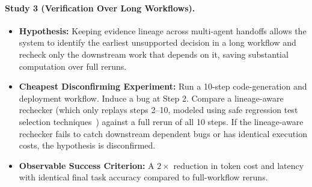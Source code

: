 \documentclass[manuscript,screen,nonacm]{acmart}
\begin{document}
\paragraph{Study 3 (Verification Over Long Workflows).}
\begin{itemize}
    \item \textbf{Hypothesis:} Keeping evidence lineage across multi-agent handoffs allows the system to identify the earliest unsupported decision in a long workflow and recheck only the downstream work that depends on it, saving substantial computation over full reruns.
    \item \textbf{Cheapest Disconfirming Experiment:} Run a 10-step code-generation and deployment workflow. Induce a bug at Step 2. Compare a lineage-aware rechecker (which only replays steps 2--10, modeled using safe regression test selection techniques~\cite{rothermel1997safe,gligoric2015practical}) against a full rerun of all 10 steps. If the lineage-aware rechecker fails to catch downstream dependent bugs or has identical execution costs, the hypothesis is disconfirmed.
    \item \textbf{Observable Success Criterion:} A $2\times$ reduction in token cost and latency with identical final task accuracy compared to full-workflow reruns.
\end{itemize}



\end{document}
